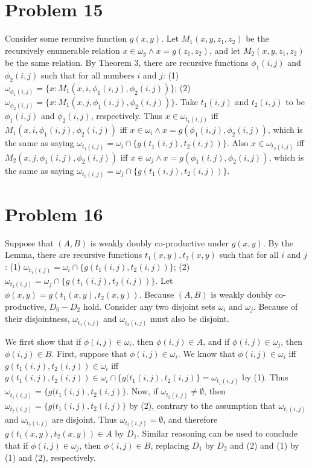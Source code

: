 \documentclass{article}
\theoremstyle{definition}
\begin{document}
\section*{Problem 15}
Consider some recursive function $g(x,y)$. Let $M_1(x,y,z_1,z_2)$ be the recursively enumerable relation $x\in\omega_y\wedge x=g(z_1,z_2)$, and let $M_2(x,y,z_1,z_2)$ be the same relation. By 
Theorem 3, there are recursive functions $\phi_1(i,j)$ and $\phi_2(i,j)$ such that for all numbers $i$ and $j$:\newline
(1) $\omega_{\phi_1(i,j)}=\{x:M_1(x,i,\phi_1(i,j),\phi_2(i,j))\}$;\newline
(2) $\omega_{\phi_2(i,j)}=\{x:M_1(x,j,\phi_1(i,j),\phi_2(i,j))\}$.\newline
Take $t_1(i,j)$ and $t_2(i,j)$ to be $\phi_1(i,j)$ and $\phi_2(i,j)$, respectively. Thus $x\in\omega_{t_1(i,j)}$ iff $M_1(x,i,\phi_1(i,j),\phi_2(i,j))$ iff 
$x\in\omega_i\wedge x=g(\phi_1(i,j),\phi_2(i,j))$, which is the same as saying $\omega_{t_1(i,j)}=\omega_i\cap\{g(t_1(i,j),t_2(i,j))\}$. Also 
$x\in\omega_{t_2(i,j)}$ iff $M_2(x,j,\phi_1(i,j),\phi_2(i,j))$ iff $x\in\omega_j\wedge x=g(\phi_1(i,j),\phi_2(i,j))$, which is the same as saying 
$\omega_{t_2(i,j)}=\omega_j\cap\{g(t_1(i,j),t_2(i,j))\}$.

\section*{Problem 16}
Suppose that $(A,B)$ is weakly doubly co-productive under $g(x,y)$. By the Lemma, there are recursive functions $t_1(x,y),t_2(x,y)$ such that for all $i$ and $j$:\newline
(1) $\omega_{t_1(i,j)}=\omega_i\cap\{g(t_1(i,j),t_2(i,j))\}$;\newline
(2) $\omega_{t_2(i,j)}=\omega_j\cap\{g(t_1(i,j),t_2(i,j))\}$.\newline
Let $\phi(x,y)=g(t_1(x,y),t_2(x,y))$. Because $(A,B)$ is weakly doubly co-productive, $D_0-D_2$ hold. Consider any two disjoint sets $\omega_i$ and $\omega_j$. 
Because of their disjointness, $\omega_{t_1(i,j)}$ and $\omega_{t_2(i,j)}$ must also be disjoint.


We first show that if $\phi(i,j)\in\omega_i$, then $\phi(i,j)\in A$, and if $\phi(i,j)\in\omega_j$, then $\phi(i,j)\in B$. 
First, suppose that $\phi(i,j)\in\omega_i$. 
We know that $\phi(i,j)\in\omega_i$ iff $g(t_1(i,j),t_2(i,j))\in\omega_i$ iff
$g(t_1(i,j),t_2(i,j))\in\omega_i\cap\{g(t_1(i,j),t_2(i,j)\}=\omega_{t_1(i,j)}$ by (1). 
Thus $\omega_{t_1(i,j)}=\{g(t_1(i,j),t_2(i,j)\}$. Now, if $\omega_{t_2(i,j)}\ne\emptyset$, then 
$\omega_{t_2(i,j)}=\{g(t_1(i,j),t_2(i,j)\}$ by (2), contrary to the assumption that $\omega_{t_1(i,j)}$ and $\omega_{t_2(i,j)}$ are disjoint. Thus 
$\omega_{t_2(i,j)}=\emptyset$, and therefore $g(t_1(x,y),t_2(x,y))\in A$ by $D_1$. Similar reasoning can be used to conclude that if $\phi(i,j)\in\omega_j$, then 
$\phi(i,j)\in B$, replacing $D_1$ by $D_2$ and (2) and (1) by (1) and (2), respectively. 
\end{document}
